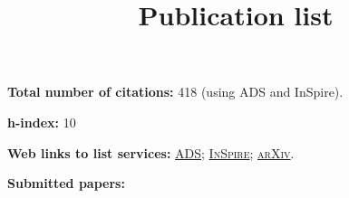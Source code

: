 \documentclass[11pt,letterpaper,sans]{moderncv}   %
\title{Publication list}
\begin{document}
\maketitle


\textcolor{color1}{\textbf{Total number of citations:}} 418 (using ADS and InSpire).

\textcolor{color1}{\textbf{h-index:}} 10


\textcolor{color1}{\textbf{Web links to list services:}}
\href{http://labs.adsabs.harvard.edu/adsabs/search/?q=author%3A%22Gerosa%2C+Davide%22&month_from=&year_from=&month_to=&year_to=&db_f=&nr=&article=1&bigquery=&re_sort_type=CITED&re_sort_dir=desc}{\textsc{ADS}}; 
\href{http://inspirehep.net/search?ln=en&ln=en&p=exactauthor%3AD.Gerosa.1&of=hb&action_search=Search&sf=&so=d&rm=citation&rg=25&sc=0}{\textsc{InSpire}}; 
\href{http://arxiv.org/a/gerosa_d_1.html}{\textsc{arXiv}}.

\vspace{0.7cm}







\textcolor{color1}{\textbf{Submitted papers:}}
\vspace{-0.5cm}
\end{document}
